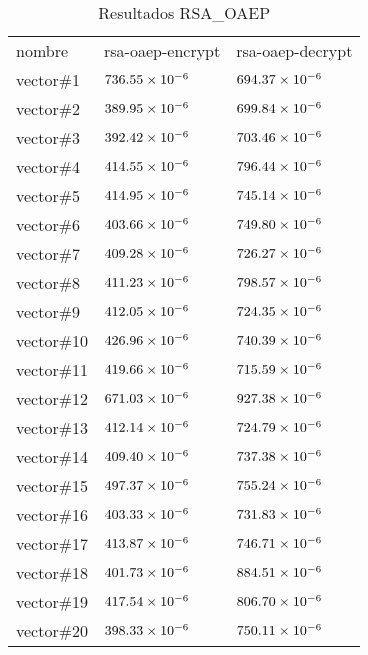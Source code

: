 \documentclass[../main.tex]{subfiles}
\begin{document}
\begin{table*}[]
  \centering
  \caption{Resultados RSA\_OAEP}\label{tab:rsa}
  \begin{tabular}{|m{2cm}<{\centering}|m{2cm}<{\centering}|m{2cm}<{\centering}|}
    \rowcolor[HTML]{000000}
    {\color[HTML]{FFFFFF} nombre} & {\color[HTML]{FFFFFF} rsa-oaep-encrypt} & {\color[HTML]{FFFFFF} rsa-oaep-decrypt} \\
    vector\#1  & $\num{736.55E-06}$ & $\num{694.37E-06}$ \\ \hline
    \rowcolor[HTML]{C0C0C0}
    vector\#2  & $\num{389.95E-06}$ & $\num{699.84E-06}$ \\ \hline
    vector\#3  & $\num{392.42E-06}$ & $\num{703.46E-06}$ \\ \hline
    \rowcolor[HTML]{C0C0C0}
    vector\#4  & $\num{414.55E-06}$ & $\num{796.44E-06}$ \\ \hline
    vector\#5  & $\num{414.95E-06}$ & $\num{745.14E-06}$ \\ \hline
    \rowcolor[HTML]{C0C0C0}
    vector\#6  & $\num{403.66E-06}$ & $\num{749.80E-06}$ \\ \hline
    vector\#7  & $\num{409.28E-06}$ & $\num{726.27E-06}$ \\ \hline
    \rowcolor[HTML]{C0C0C0}
    vector\#8  & $\num{411.23E-06}$ & $\num{798.57E-06}$ \\ \hline
    vector\#9  & $\num{412.05E-06}$ & $\num{724.35E-06}$ \\ \hline
    \rowcolor[HTML]{C0C0C0}
    vector\#10 & $\num{426.96E-06}$ & $\num{740.39E-06}$ \\ \hline
    vector\#11 & $\num{419.66E-06}$ & $\num{715.59E-06}$ \\ \hline
    \rowcolor[HTML]{C0C0C0}
    vector\#12 & $\num{671.03E-06}$ & $\num{927.38E-06}$ \\ \hline
    vector\#13 & $\num{412.14E-06}$ & $\num{724.79E-06}$ \\ \hline
    \rowcolor[HTML]{C0C0C0}
    vector\#14 & $\num{409.40E-06}$ & $\num{737.38E-06}$ \\ \hline
    vector\#15 & $\num{497.37E-06}$ & $\num{755.24E-06}$ \\ \hline
    \rowcolor[HTML]{C0C0C0}
    vector\#16 & $\num{403.33E-06}$ & $\num{731.83E-06}$ \\ \hline
    vector\#17 & $\num{413.87E-06}$ & $\num{746.71E-06}$ \\ \hline
    \rowcolor[HTML]{C0C0C0}
    vector\#18 & $\num{401.73E-06}$ & $\num{884.51E-06}$ \\ \hline
    vector\#19 & $\num{417.54E-06}$ & $\num{806.70E-06}$ \\ \hline
    \rowcolor[HTML]{C0C0C0}
    vector\#20 & $\num{398.33E-06}$ & $\num{750.11E-06}$ \\ \hline
  \end{tabular}
\end{table*}
\end{document}
